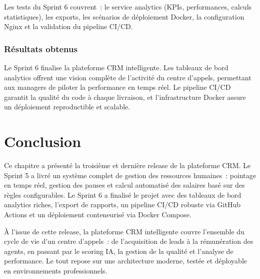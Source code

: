 Les tests du Sprint 6 couvrent~: le service analytics (KPIs, performances, calculs
statistiques), les exports, les scénarios de déploiement Docker, la configuration
Nginx et la validation du pipeline CI/CD.

\subsubsection{Résultats obtenus}

Le Sprint 6 finalise la plateforme CRM intelligente. Les tableaux de bord analytics
offrent une vision complète de l'activité du centre d'appels, permettant aux managers
de piloter la performance en temps réel. Le pipeline CI/CD garantit la qualité du
code à chaque livraison, et l'infrastructure Docker assure un déploiement
reproductible et scalable.

\section*{Conclusion}
\label{sec:chap6_conclusion}

Ce chapitre a présenté la troisième et dernière release de la plateforme CRM. Le Sprint 5
a livré un système complet de gestion des ressources humaines~: pointage en temps réel,
gestion des pauses et calcul automatisé des salaires basé sur des règles configurables.
Le Sprint 6 a finalisé le projet avec des tableaux de bord analytics riches, l'export
de rapports, un pipeline CI/CD robuste via GitHub Actions et un déploiement
conteneurisé via Docker Compose.

À l'issue de cette release, la plateforme CRM intelligente couvre l'ensemble du cycle
de vie d'un centre d'appels~: de l'acquisition de leads à la rémunération des agents,
en passant par le scoring IA, la gestion de la qualité et l'analyse de performance.
Le tout repose sur une architecture moderne, testée et déployable en environnements
professionnels.
